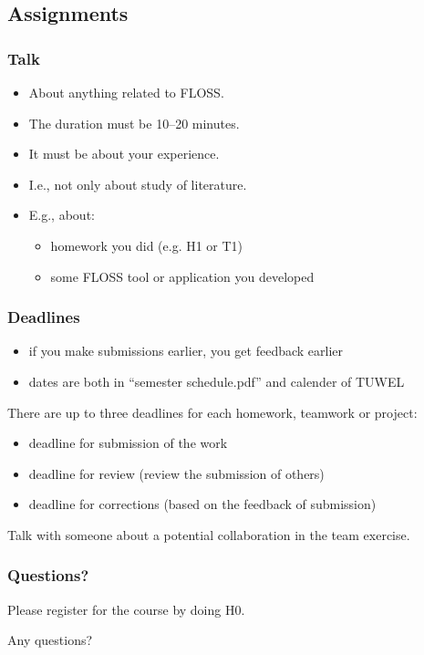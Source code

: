 \subsection{Assignments}
\begin{frame}
	\frametitle{Talk}
	\begin{itemize}
		\item About anything related to FLOSS.
		\item The duration must be 10--20 minutes.
		\item It must be about your experience.
		\item I.e., not only about study of literature.
		\item E.g., about:
		\begin{itemize}
			\item homework you did (e.g. H1 or T1)
			\item some FLOSS tool or application you developed
		\end{itemize}
	\end{itemize}
\end{frame}

\begin{frame}
	\frametitle{Deadlines}

	\begin{itemize}
	\item if you make submissions earlier, you get feedback earlier
	\item dates are both in ``semester schedule.pdf'' and calender of TUWEL
	\end{itemize}

	There are up to three deadlines for each homework, teamwork or project:

	\begin{itemize}
	\item deadline for submission of the work
	\item deadline for review (review the submission of others)
	\item deadline for corrections (based on the feedback of submission)
	\end{itemize}
\end{frame}

\begin{assignment}
	\begin{task}
	Talk with someone about a potential collaboration in the team exercise.
	\end{task}
\end{assignment}

\begin{assignment}
	\frametitle{Questions?}
	\begin{task}
	Please register for the course by doing H0.
	\end{task}

	\begin{task}
	Any questions?
	\end{task}
\end{assignment}



\nocite{raab2017introducing}

\appendix

\begin{frame}[allowframebreaks]
	
	
\end{frame}




